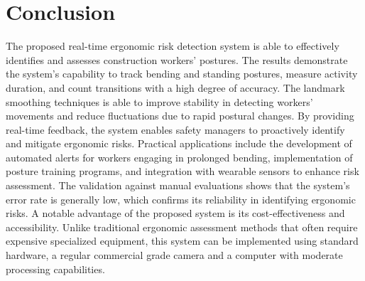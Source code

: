 \documentclass[11pt]{article}
\begin{document}

 






\section{Conclusion}

The proposed real-time ergonomic risk detection system is able to effectively identifies and assesses construction workers' postures. The results demonstrate the system's capability to track bending and standing postures, measure activity duration, and count transitions with a high degree of accuracy. The landmark smoothing techniques is able to improve stability in detecting workers' movements and reduce fluctuations due to rapid postural changes. By providing real-time feedback, the system enables safety managers to proactively identify and mitigate ergonomic risks. Practical applications include the development of automated alerts for workers engaging in prolonged bending, implementation of posture training programs, and integration with wearable sensors to enhance risk assessment. The validation against manual evaluations shows that the system’s error rate is generally low, which confirms its reliability in identifying ergonomic risks. A notable advantage of the proposed system is its cost-effectiveness and accessibility. Unlike traditional ergonomic assessment methods that often require expensive specialized equipment, this system can be implemented using standard hardware, a regular commercial grade camera and a computer with moderate processing capabilities. 
\end{document}
